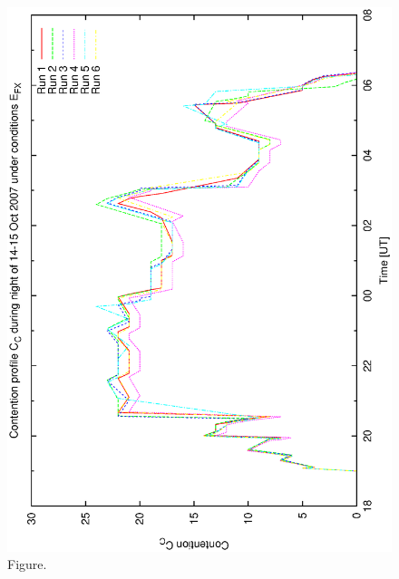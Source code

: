 \documentclass[12pt,a4paper]{article}
\begin{document}
\begin{figure}[htbp]
 \begin{center}
  \includegraphics[scale=1.0, angle=0]{figures/bsa_ex_cont.eps}
 \end{center}
  \caption[Figure.]
{Figure.}
\end{figure}
\clearpage
\end{document}
